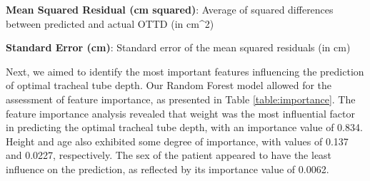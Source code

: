 \documentclass[11pt]{article}
\begin{document}
\begin{table}[h]
\caption{Comparison of Mean Squared Residuals between Machine Learning Model and Formula-based Model}
\label{table:comparison}
\begin{threeparttable}
\renewcommand{\TPTminimum}{\linewidth}
\begin{tablenotes}
\footnotesize
\item \textbf{Mean Squared Residual (cm squared)}: Average of squared differences between predicted and actual OTTD (in cm\textasciicircum{}2) 
\item \textbf{Standard Error (cm)}: Standard error of the mean squared residuals (in cm)
\end{tablenotes}
\end{threeparttable}
\end{table}


Next, we aimed to identify the most important features influencing the prediction of optimal tracheal tube depth. Our Random Forest model allowed for the assessment of feature importance, as presented in Table \ref{table:importance}. The feature importance analysis revealed that weight was the most influential factor in predicting the optimal tracheal tube depth, with an importance value of 0.834. Height and age also exhibited some degree of importance, with values of 0.137 and 0.0227, respectively. The sex of the patient appeared to have the least influence on the prediction, as reflected by its importance value of 0.0062.
\end{document}
